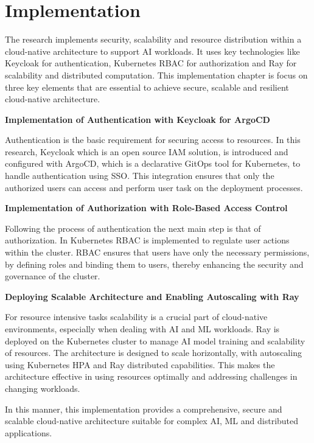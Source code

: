 \chapter{Implementation}


The research implements security, scalability and resource distribution within a cloud-native architecture to support AI workloads. It uses key technologies like Keycloak for authentication, Kubernetes RBAC for authorization and Ray for scalability and distributed computation. This implementation chapter is focus on three key elements that are essential to achieve secure, scalable and resilient cloud-native architecture.

\textbf{Implementation of Authentication with Keycloak for ArgoCD} 


Authentication is the basic requirement for securing access to resources. In this research, Keycloak which is an open source IAM solution, is introduced and configured with ArgoCD, which is a declarative GitOps tool for Kubernetes, to handle authentication using SSO. This integration ensures that only the authorized users can access and perform user task on the deployment processes. \cite{redhat_docs}

\textbf{Implementation of Authorization with Role-Based Access Control} 

Following the process of authentication the next main step is that of authorization. In Kubernetes RBAC is implemented to regulate user actions within the cluster. RBAC ensures that users have only the necessary permissions, by defining roles and binding them to users, thereby enhancing the security and governance of the cluster. \cite{Kubernetes_doc}

\textbf{Deploying Scalable Architecture and Enabling Autoscaling with Ray} 

For resource intensive tasks scalability is a crucial part of cloud-native environments, especially when dealing with AI and ML workloads. Ray is deployed on the Kubernetes cluster to manage AI model training and scalability of resources. The architecture is designed to scale horizontally, with autoscaling using Kubernetes HPA and Ray distributed capabilities. This makes the architecture effective in using resources optimally and addressing challenges in changing workloads. \cite{moritz, Kubernetes_doc}

In this manner, this implementation provides a comprehensive, secure and scalable cloud-native architecture suitable for complex AI, ML and distributed applications.

